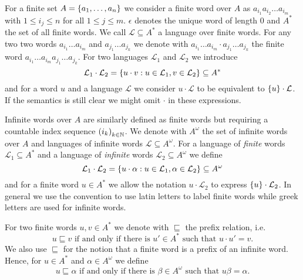 For a finite set $A = \left\{a_{1},\dots, a_{n}\right\}$ we consider a finite word over
$A$ as $a_{i_{1}}a_{i_{2}}\dots a_{i_{m}}$ with $1\leq i_{j}\leq n$ for all 
$1\leq j\leq m$. $\epsilon$ denotes the unique word of length $0$ and $A^{*}$
the set of all finite words. We call $\mathcal{L}\subseteq A^{*}$ a language 
over finite words. For any two two words $a_{i_{1}}\dots a_{i_{m}}$ and
$a_{j_{1}}\dots a_{j_{k}}$ we denote with 
$a_{i_{1}}\dots a_{i_{m}}\cdot a_{j_{1}}\dots a_{j_{k}}$ the finite word
$a_{i_{1}}\dots a_{i_{m}}a_{j_{1}}\dots a_{j_{k}}$. For two languages 
$\mathcal{L}_{1}$ and $\mathcal{L}_{2}$ we introduce
\begin{equation*}
  \mathcal{L}_{1}\cdot\mathcal{L}_{2} = \left\{
    u\cdot v: u\in\mathcal{L}_{1}, v\in\mathcal{L}_{2}\right\}\subseteq A^{*}
\end{equation*}
and for a word $u$ and a language $\mathcal{L}$ we consider 
$u\cdot\mathcal{L}$ to be equivalent to $\left\{u\right\}\cdot\mathcal{L}$. If the 
semantics is still clear we might omit $\cdot$ in these expressions.

Infinite words over $A$ are similarly defined as finite words but requiring a
countable index sequence $\left(i_{k}\right)_{k\in\mathbb{N}}$. We denote with 
$A^{\omega}$ the set of infinite words over $A$ and languages of infinite 
words $\mathcal{L}\subseteq A^{\omega}$. For a language of \emph{finite} words
$\mathcal{L}_{1}\subseteq A^{*}$
and a language of \emph{infinite} words $\mathcal{L}_{2}\subseteq A^{\omega}$
we define
\begin{equation*}
  \mathcal{L}_{1}\cdot\mathcal{L}_{2} = \left\{
    u\cdot\alpha:u\in\mathcal{L}_{1}, \alpha\in\mathcal{L}_{2}\right\}
  \subseteq A^{\omega}
\end{equation*}
and for a finite word $u\in A^{*}$ we allow the notation
$u\cdot\mathcal{L}_{2}$ to express $\left\{u\right\}\cdot\mathcal{L}_{2}$. In general we
use the convention to use latin letters to label finite words while greek 
letters are used for infinite words.

For two finite words $u, v\in A^{*}$ we denote with $\sqsubseteq$ the prefix 
relation, i.e.
\begin{equation*}
  u\sqsubseteq v \text{ if and only if there is }u'\in A^{*}\text{ such that }
    u\cdot u' = v.
\end{equation*}
We also use $\sqsubseteq$ for the notion that a finite word is a prefix of an
infinite word. Hence, for $u\in A^{*}$ and $\alpha\in A^{\omega}$ we define
\begin{equation*}
  u\sqsubseteq\alpha\text{ if and only if there is }\beta\in A^{\omega}
    \text{ such that }u\beta = \alpha.
\end{equation*}

